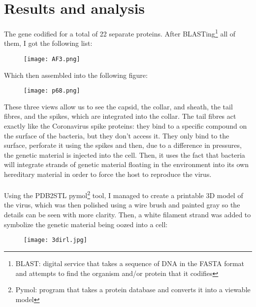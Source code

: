\section{Results and analysis}
The gene codified for a total of 22 separate proteins. After BLASTing\footnote{BLAST: digital service that takes a sequence of DNA in the FASTA format and attempts to find the organism and/or protein that it codifies} all of them, I got the following list:
\begin{center}\begin{figure}[H]\centering\texttt{[image: AF3.png]}\end{figure}\end{center}
Which then assembled into the following figure:
\begin{center}\begin{figure}[H]\centering\texttt{[image: p68.png]}\end{figure}\end{center}
These three views allow us to see the capsid, the collar, and sheath, the tail fibres, and the spikes, which are integrated into the collar. The tail fibres act exactly like the Coronavirus spike proteins: they bind to a specific compound on the surface of the bacteria, but they don't access it. They only bind to the surface, perforate it using the spikes and then, due to a difference in pressures, the genetic material is injected into the cell. Then, it uses the fact that bacteria will integrate strands of genetic material floating in the environment into its own hereditary material in order to force the host to reproduce the virus.
\paragraph{}Using the PDB2STL pymol\footnote{Pymol: program that takes a protein database and converts it into a viewable model} tool, I managed to create a printable 3D model of the virus, which was then polished using a wire brush and painted gray so the details can be seen with more clarity. Then, a white filament strand was added to symbolize the genetic material being oozed into a cell:
\begin{center}\begin{figure}[H]\centering\texttt{[image: 3dirl.jpg]}\end{figure}\end{center}
